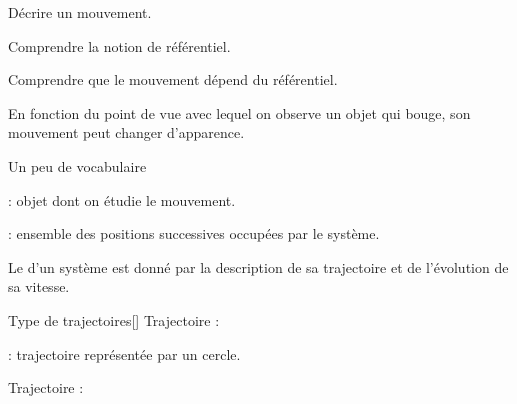 \teteSndMouv

\nomPrenomClasse
{}

\begin{objectifs}
  \item Décrire un mouvement.
  \item Comprendre la notion de référentiel.
  \item Comprendre que le mouvement dépend du référentiel.
\end{objectifs}

\begin{contexte}
  En fonction du point de vue avec lequel on observe un objet qui bouge, son mouvement peut changer d'apparence.

\end{contexte}



\begin{doc}{Un peu de vocabulaire}
  \begin{importants}
     : objet dont on étudie le mouvement.
  \end{importants}
  
  \begin{importants}
     : ensemble des positions successives occupées par le système.
  \end{importants}
  
  Le  d'un système est donné par la description de sa trajectoire et de l'évolution de sa vitesse.
\end{doc} 


\begin{doc}{Type de trajectoires}[\label{doc:trajectoires}]
  Trajectoire  : 
  
   : trajectoire représentée par un cercle.
  
  Trajectoire  : 
\end{doc}


